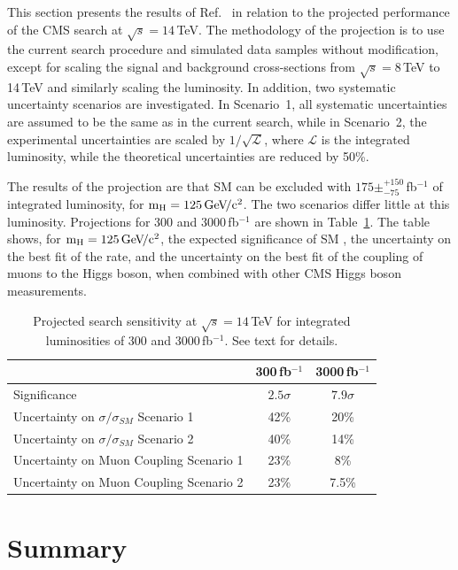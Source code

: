 \documentclass[10pt]{article}
\begin{document}
This section presents the results of Ref.~\cite{CMS:2013xfa} in relation to
the projected performance of the CMS \hmm{} search at $\sqrt{s}=14$\,TeV.
The methodology of the projection is to use the current \hmm{} search
procedure and simulated data samples without modification, except
for scaling the signal and background cross-sections from $\sqrt{s}=8$\,TeV
to 14\,TeV and similarly scaling the luminosity.
In addition, two systematic uncertainty scenarios are investigated.
In Scenario~1, all systematic uncertainties are assumed to be the same
as in the current search, while in Scenario~2, the experimental uncertainties
are scaled by $1/\sqrt{\mathcal{L}}$, where $\mathcal{L}$ is the integrated luminosity, 
while the theoretical uncertainties are reduced by 50\%.

The results of the projection are that SM \hmm{} can be excluded with 
$175\pm^{+150}_{-75}$\,fb$^{-1}$ of integrated luminosity, for $\mathrm{m_H}{}=125\,\mathrm{Ge\kern -0.1em V\!/c^2}{}$.  
The two scenarios differ little at this luminosity.  
Projections for 300 and 3000\,fb$^{-1}$ are shown in Table~\ref{tab:projTab}.  
The table shows, for $\mathrm{m_H}{}=125\,\mathrm{Ge\kern -0.1em V\!/c^2}{}$, the expected significance of SM \hmm{}, the uncertainty
on the best fit of the \hmm{} rate, and the uncertainty on the best fit
of the coupling of muons to the Higgs boson, when combined with other CMS Higgs boson measurements.

\begin{table}[t]
\begin{center}
\caption{Projected \hmm search sensitivity at $\sqrt{s}=14$\,TeV for integrated 
            luminosities of 300 and 3000\,fb$^{-1}$.  See text for details.}
\label{tab:projTab}
  \begin{tabular}{lcc} \hline
      & 300\,fb$^{-1}$ & 3000\,fb$^{-1}$ \\ \hline
    Significance  & $2.5\sigma$ & $7.9\sigma$ \\ 
    Uncertainty on $\sigma/\sigma_{SM}$ Scenario 1  & 42\% & 20\% \\ 
    Uncertainty on $\sigma/\sigma_{SM}$ Scenario 2  & 40\% & 14\% \\ 
    Uncertainty on Muon Coupling Scenario 1  & 23\% & 8\% \\ 
    Uncertainty on Muon Coupling Scenario 2  & 23\% & 7.5\% \\ \hline
  \end{tabular}
\end{center}
\end{table}

\section{Summary}
\end{document}
